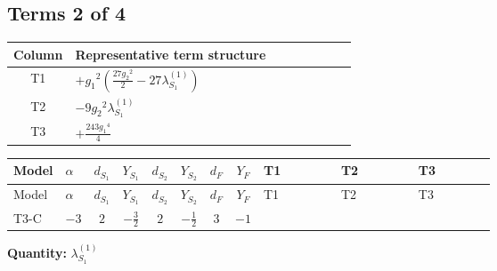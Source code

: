 \documentclass[8pt]{article}
\begin{document}
\begin{landscape}
\subsection*{Terms 2 of 4}
\begin{center}
\begin{tabular}{@{}c >{\raggedright\arraybackslash}p{0.82\linewidth}@{}}
\toprule
Column & Representative term structure \\
\midrule
T1 & \(\displaystyle +{g_1}^2 \left(\frac{27 {g_2}^2}{2}-27 {\lambda_{S_1}^{(1)}}\right)\) \\
\midrule
T2 & \(\displaystyle -9 {g_2}^2 {\lambda_{S_1}^{(1)}}\) \\
\midrule
T3 & \(\displaystyle +\frac{243 {g_1}^4}{4}\) \\
\midrule
\bottomrule
\end{tabular}
\end{center}
\smallskip
\tiny
\begin{longtable}{@{}llcccccc >{\raggedright\arraybackslash}p{0.21\linewidth} >{\raggedright\arraybackslash}p{0.21\linewidth} >{\raggedright\arraybackslash}p{0.21\linewidth}@{}}
\toprule
Model & $\alpha$ & $d_{S_1}$ & $Y_{S_1}$ & $d_{S_2}$ & $Y_{S_2}$ & $d_F$ & $Y_F$ & T1 & T2 & T3 \\
\midrule
\endfirsthead
\toprule
Model & $\alpha$ & $d_{S_1}$ & $Y_{S_1}$ & $d_{S_2}$ & $Y_{S_2}$ & $d_F$ & $Y_F$ & T1 & T2 & T3 \\
\midrule
\endhead
T3-C & $-3$ & $2$ & $-\frac{3}{2}$ & $2$ & $-\frac{1}{2}$ & $3$ & $-1$ & \scriptsize\adjustbox{max width=\linewidth}{$\begin{gathered} +{g_1}^2 \left(\frac{27 {g_2}^2}{2}-27 {\lambda_{S_1}^{(1)}}\right)\end{gathered}$} & \scriptsize\adjustbox{max width=\linewidth}{$\begin{gathered} -9 {g_2}^2 {\lambda_{S_1}^{(1)}}\end{gathered}$} & \scriptsize\adjustbox{max width=\linewidth}{$\begin{gathered} +\frac{243 {g_1}^4}{4}\end{gathered}$} \\
\midrule
\bottomrule
\end{longtable}
\clearpage
\noindent\textbf{Quantity: }$\lambda_{S_1}^{(1)}$\par\smallskip

\end{landscape}
\end{document}
